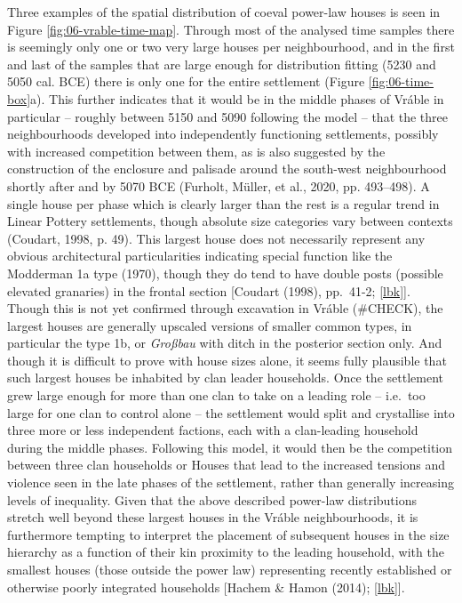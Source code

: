 \documentclass[
  12pt,
]{book}
\begin{document}
Three examples of the spatial distribution of coeval power-law houses is seen in Figure \ref{fig:06-vrable-time-map}. Through most of the analysed time samples there is seemingly only one or two very large houses per neighbourhood, and in the first and last of the samples that are large enough for distribution fitting (5230 and 5050 cal. BCE) there is only one for the entire settlement (Figure \ref{fig:06-time-box}a). This further indicates that it would be in the middle phases of Vráble in particular -- roughly between 5150 and 5090 following the model -- that the three neighbourhoods developed into independently functioning settlements, possibly with increased competition between them, as is also suggested by the construction of the enclosure and palisade around the south-west neighbourhood shortly after and by 5070 BCE (Furholt, Müller, et al., 2020, pp. 493--498). A single house per phase which is clearly larger than the rest is a regular trend in Linear Pottery settlements, though absolute size categories vary between contexts (Coudart, 1998, p. 49). This largest house does not necessarily represent any obvious architectural particularities indicating special function like the Modderman 1a type (1970), though they do tend to have double posts (possible elevated granaries) in the frontal section {[}Coudart (1998), pp.~41-2; \ref{lbk}{]}. Though this is not yet confirmed through excavation in Vráble (\#CHECK), the largest houses are generally upscaled versions of smaller common types, in particular the type 1b, or \emph{Großbau} with ditch in the posterior section only. And though it is difficult to prove with house sizes alone, it seems fully plausible that such largest houses be inhabited by clan leader households. Once the settlement grew large enough for more than one clan to take on a leading role -- i.e.~too large for one clan to control alone -- the settlement would split and crystallise into three more or less independent factions, each with a clan-leading household during the middle phases. Following this model, it would then be the competition between three clan households or Houses that lead to the increased tensions and violence seen in the late phases of the settlement, rather than generally increasing levels of inequality. Given that the above described power-law distributions stretch well beyond these largest houses in the Vráble neighbourhoods, it is furthermore tempting to interpret the placement of subsequent houses in the size hierarchy as a function of their kin proximity to the leading household, with the smallest houses (those outside the power law) representing recently established or otherwise poorly integrated households {[}Hachem \& Hamon (2014); \ref{lbk}{]}.
\end{document}
